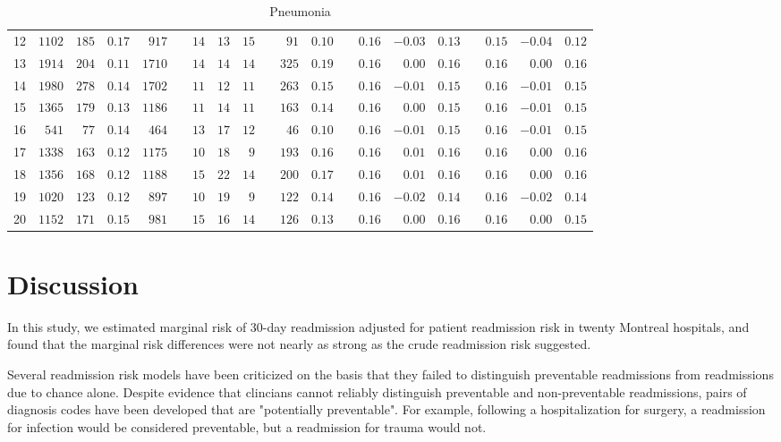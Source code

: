 \documentclass[]{article}\usepackage[]{graphicx}\usepackage[]{color}
\begin{document}
\begin{landscape}
\begin{table}[!tbp]
\begin{center}
\begin{tabular}{lrrrrcrrrcrrcrrrcrrr}
12&$1102$&$185$&$0.17$&$ 917$&&$14$&$13$&$15$&&$ 91$&$0.10$&&$0.16$&$-0.03$&$0.13$&&$0.15$&$-0.04$&$0.12$\tabularnewline
13&$1914$&$204$&$0.11$&$1710$&&$14$&$14$&$14$&&$325$&$0.19$&&$0.16$&$ 0.00$&$0.16$&&$0.16$&$ 0.00$&$0.16$\tabularnewline
14&$1980$&$278$&$0.14$&$1702$&&$11$&$12$&$11$&&$263$&$0.15$&&$0.16$&$-0.01$&$0.15$&&$0.16$&$-0.01$&$0.15$\tabularnewline
15&$1365$&$179$&$0.13$&$1186$&&$11$&$14$&$11$&&$163$&$0.14$&&$0.16$&$ 0.00$&$0.15$&&$0.16$&$-0.01$&$0.15$\tabularnewline
16&$ 541$&$ 77$&$0.14$&$ 464$&&$13$&$17$&$12$&&$ 46$&$0.10$&&$0.16$&$-0.01$&$0.15$&&$0.16$&$-0.01$&$0.15$\tabularnewline
17&$1338$&$163$&$0.12$&$1175$&&$10$&$18$&$ 9$&&$193$&$0.16$&&$0.16$&$ 0.01$&$0.16$&&$0.16$&$ 0.00$&$0.16$\tabularnewline
18&$1356$&$168$&$0.12$&$1188$&&$15$&$22$&$14$&&$200$&$0.17$&&$0.16$&$ 0.01$&$0.16$&&$0.16$&$ 0.00$&$0.16$\tabularnewline
19&$1020$&$123$&$0.12$&$ 897$&&$10$&$19$&$ 9$&&$122$&$0.14$&&$0.16$&$-0.02$&$0.14$&&$0.16$&$-0.02$&$0.14$\tabularnewline
20&$1152$&$171$&$0.15$&$ 981$&&$15$&$16$&$14$&&$126$&$0.13$&&$0.16$&$ 0.00$&$0.16$&&$0.16$&$ 0.00$&$0.15$\tabularnewline
\hline
\end{tabular}

\caption{Pneumonia\label{round}}\end{center}

\end{table}



\setmainfont[Scale=1.25]{Cambria}
\linespread{1.25}


\end{landscape}
\section{Discussion}

In this study, we estimated marginal risk of 30-day readmission adjusted for patient readmission risk in twenty Montreal hospitals, and found that the marginal risk differences were not nearly as strong as the crude readmission risk suggested.

Several readmission risk models have been criticized on the basis that they failed to distinguish preventable readmissions from readmissions due to chance alone. Despite evidence that clincians cannot reliably distinguish preventable and non-preventable readmissions, pairs of diagnosis codes have been developed that are "potentially preventable". For example, following a hospitalization for surgery, a readmission for infection would be considered preventable, but a readmission for trauma would not.
\end{document}
